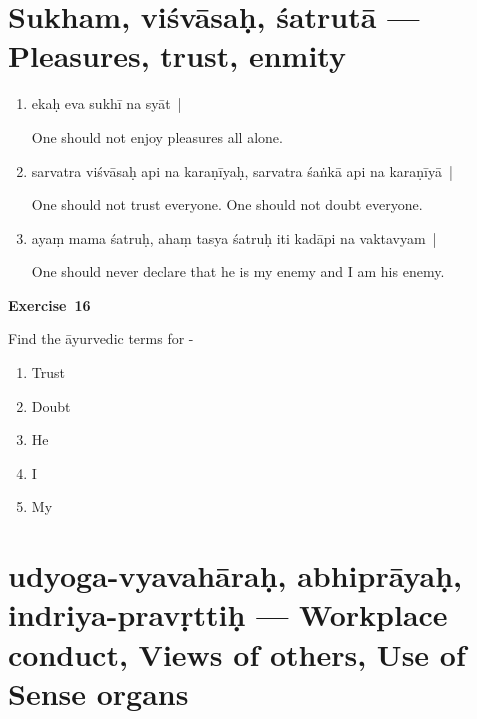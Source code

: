 \chapter{Sukham, viśvāsaḥ, śatrutā --- Pleasures, trust, enmity}

\begin{enumerate}
\itemsep=0pt
\item {}

ekaḥ eva sukhī na syāt~|

One should not enjoy pleasures all alone. 

\item {}

sarvatra viśvāsaḥ api na karaṇīyaḥ, sarvatra śaṅkā api na karaṇīyā~|

One should not trust everyone. One should not doubt everyone. 

\item {}

ayaṃ mama śatruḥ, ahaṃ tasya śatruḥ iti kadāpi na vaktavyam~|  

One should never declare that he is my enemy and I am his enemy.
\end{enumerate}

\centerline{\textbf{Exercise~16}}

Find the āyurvedic terms for -
\begin{enumerate}
\itemsep=0pt
\renewcommand{\theenumi}{\alph{enumi}}
\renewcommand{\labelenumi}{\theenumi.}
\item Trust
\item Doubt
\item He
\item I
\item My
\end{enumerate}

\chapter{udyoga-vyavahāraḥ, abhiprāyaḥ, indriya-pravṛttiḥ --- Workplace conduct, Views of others, Use of Sense organs}

